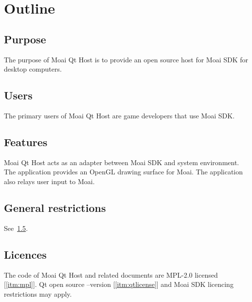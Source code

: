 \chapter{Outline}
\label{chap:outline}

\section{Purpose}

The purpose of Moai Qt Host is to provide an open source host for Moai SDK for desktop computers.

\section{Users}

The primary users of Moai Qt Host are game developers that use Moai SDK.

\section{Features}

Moai Qt Host acts as an adapter between Moai SDK and system environment.
The application provides an OpenGL drawing surface for Moai. The application also relays user input to Moai.

\section{General restrictions}

See~\ref{licenses}.

\section{Licences}
\label{licenses}

The code of Moai Qt Host and related documents are MPL-2.0 licensed [\ref{itm:mpl}]. 
Qt open source --version [\ref{itm:qtlicense}] and Moai SDK licencing restrictions may apply.

